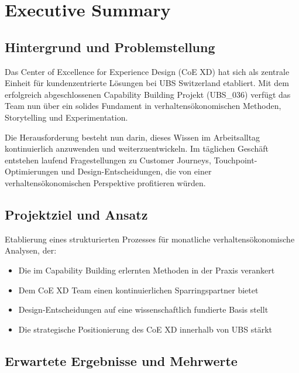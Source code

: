 \documentclass[11pt,a4paper]{article}
\begin{document}
\section{Executive Summary}

\subsection{Hintergrund und Problemstellung}

Das Center of Excellence for Experience Design (CoE XD) hat sich als zentrale Einheit für kundenzentrierte Lösungen bei UBS Switzerland etabliert. Mit dem erfolgreich abgeschlossenen Capability Building Projekt (UBS\_036) verfügt das Team nun über ein solides Fundament in verhaltensökonomischen Methoden, Storytelling und Experimentation.

Die Herausforderung besteht nun darin, dieses Wissen im Arbeitsalltag kontinuierlich anzuwenden und weiterzuentwickeln. Im täglichen Geschäft entstehen laufend Fragestellungen zu Customer Journeys, Touchpoint-Optimierungen und Design-Entscheidungen, die von einer verhaltensökonomischen Perspektive profitieren würden.

\subsection{Projektziel und Ansatz}

\begin{fainfobox}
Etablierung eines strukturierten Prozesses für monatliche verhaltensökonomische Analysen, der:
\begin{itemize}
    \item Die im Capability Building erlernten Methoden in der Praxis verankert
    \item Dem CoE XD Team einen kontinuierlichen Sparringspartner bietet
    \item Design-Entscheidungen auf eine wissenschaftlich fundierte Basis stellt
    \item Die strategische Positionierung des CoE XD innerhalb von UBS stärkt
\end{itemize}
\end{fainfobox}

\subsection{Erwartete Ergebnisse und Mehrwerte}
\end{document}
